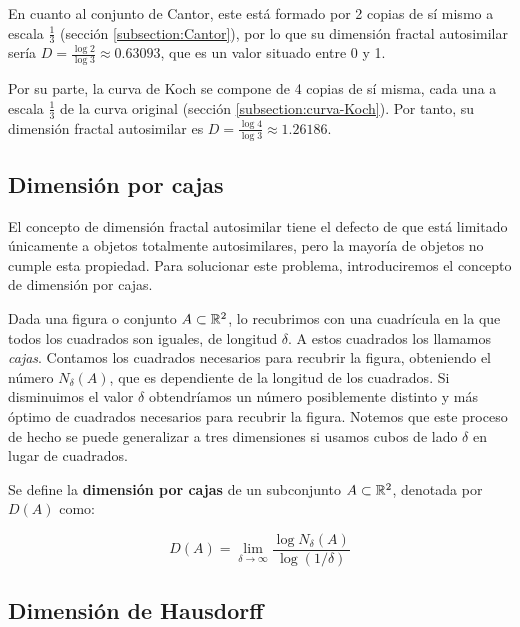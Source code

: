 En cuanto al conjunto de Cantor, este está formado por 2 copias de sí mismo a escala $\frac 1 3$ (sección \ref{subsection:Cantor}), por lo que su dimensión fractal autosimilar sería $D=\frac{\log 2}{\log 3} \approx 0.63093$, que es un valor situado entre 0 y 1.

Por su parte, la curva de Koch se compone de 4 copias de sí misma, cada una a escala $\frac 1 3$ de la curva original (sección \ref{subsection:curva-Koch}). Por tanto, su dimensión fractal autosimilar es $D=\frac{\log 4}{\log 3} \approx 1.26186$.

\subsection{Dimensión por cajas}
\label{subsection:dim-cajas}

El concepto de dimensión fractal autosimilar tiene el defecto de que está limitado únicamente a objetos totalmente autosimilares, pero la mayoría de objetos no cumple esta propiedad. Para solucionar este problema, introduciremos el concepto de dimensión por cajas.

Dada una figura o conjunto $A\subset \mathbb{R}^2$, lo recubrimos con una cuadrícula en la que todos los cuadrados son iguales, de longitud $\delta$. A estos cuadrados los llamamos \textit{cajas}. Contamos los cuadrados necesarios para recubrir la figura, obteniendo el número $N_\delta(A)$, que es dependiente de la longitud de los cuadrados. Si disminuimos el valor $\delta$ obtendríamos un número posiblemente distinto y más óptimo de cuadrados necesarios para recubrir la figura. Notemos que este proceso de hecho se puede generalizar a tres dimensiones si usamos cubos de lado $\delta$ en lugar de cuadrados.

\begin{definicion}
Se define la \textbf{dimensión por cajas} de un subconjunto $A\subset \mathbb{R}^2$, denotada por $D(A)$ como:

\begin{equation}\label{eq:dim-cajas}
D(A)=\lim_{\delta\rightarrow\infty}\frac{\log N_\delta(A)}{\log(1/\delta)}
\end{equation}

\end{definicion}

\subsection{Dimensión de Hausdorff}
\label{subsection:dim-Hausdorff}

